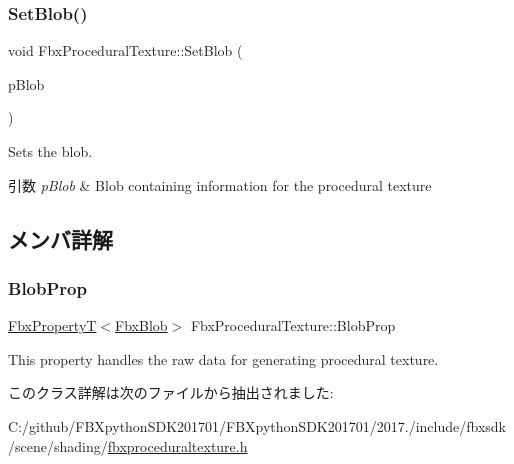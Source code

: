 \subsubsection{\texorpdfstring{Set\+Blob()}{SetBlob()}}
{\footnotesize\ttfamily void Fbx\+Procedural\+Texture\+::\+Set\+Blob (\begin{DoxyParamCaption}\item[{\hyperlink{class_fbx_blob}{Fbx\+Blob} \&}]{p\+Blob }\end{DoxyParamCaption})}

Sets the blob. 
\begin{DoxyParams}{引数}
{\em p\+Blob} & Blob containing information for the procedural texture \\
\hline
\end{DoxyParams}


\subsection{メンバ詳解}
\mbox{\label{class_fbx_procedural_texture_aaf3a45d4b05897639d7c6a8e9d8a1b69}} 
\subsubsection{\texorpdfstring{Blob\+Prop}{BlobProp}}
{\footnotesize\ttfamily \hyperlink{class_fbx_property_t}{Fbx\+PropertyT}$<$\hyperlink{class_fbx_blob}{Fbx\+Blob}$>$ Fbx\+Procedural\+Texture\+::\+Blob\+Prop}

This property handles the raw data for generating procedural texture. 

このクラス詳解は次のファイルから抽出されました\+:\begin{DoxyCompactItemize}
\item 
C\+:/github/\+F\+B\+Xpython\+S\+D\+K201701/\+F\+B\+Xpython\+S\+D\+K201701/2017./include/fbxsdk/scene/shading/\hyperlink{fbxproceduraltexture_8h}{fbxproceduraltexture.\+h}\end{DoxyCompactItemize}
